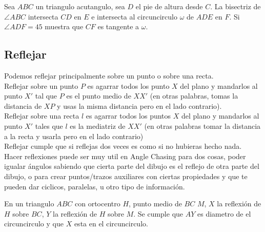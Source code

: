 \documentclass[11pt]{scrartcl}
\begin{document}
    \begin{example}
    Sea $ABC$ un triangulo acutangulo, sea $D$ el pie de altura desde $C$. La bisectriz de $\angle ABC$ intersecta $CD$ en $E$ e intersecta al circuncirculo $\omega$ de $ADE$ en $F$. Si $\angle ADF=45$ muestra que $CF$ es tangente a $\omega$.
    \end{example}
 
\subsection{Reflejar}
    Podemos reflejar principalmente sobre un punto o sobre una recta. \\
    Reflejar sobre un punto $P$ es agarrar todos los punto $X$ del plano y mandarlos al punto $X'$ tal que $P$ es el punto medio de $XX'$ (en otras palabras, tomas la distancia de $XP$ y usas la misma distancia pero en el lado contrario). \\
    Reflejar sobre una recta $l$ es agarrar todos los puntos $X$ del plano y mandarlos al punto $X'$ tales que $l$ es la mediatriz de $XX'$ (en otras palabras tomar la distancia a la recta y usarla pero en el lado contrario) \\
    Reflejar cumple que si reflejas dos veces es como si no hubieras hecho nada. \\
    Hacer reflexiones puede ser muy util en Angle Chasing para dos cosas, poder igualar \'angulos sabiendo que cierta parte del dibujo es el reflejo de otra parte del dibujo, o para crear puntos/trazos auxiliares con ciertas propiedades y que te pueden dar ciclicos, paralelas, u otro tipo de informaci\'on.  \\
    \begin{theorem}
    En un triangulo $ABC$ con ortocentro $H$, punto medio de $BC$ $M$, $X$ la reflexi\'on de $H$ sobre $BC$, $Y$ la reflexi\'on de $H$ sobre $M$. Se cumple que 
    $AY$ es diametro de el circuncirculo y que $X$ esta en el circuncirculo.
    \end{theorem}
\end{document}
